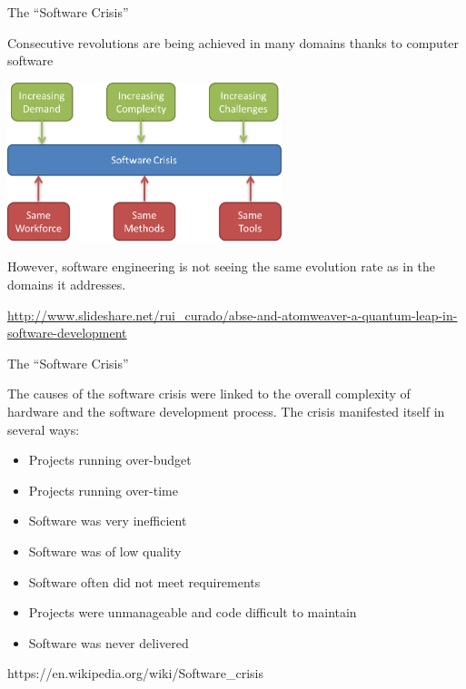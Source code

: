 \documentclass{beamer}
\begin{document}
\begin{frame}{\centerline{The ``Software Crisis''}}

Consecutive revolutions are being achieved in many domains thanks to computer software

\begin{center}
\includegraphics[width=80mm]{A2022.IDSEPC.ProcessoDiProduzione/pic-02.png}
\end{center}
However, software engineering is not seeing the same evolution rate as in the domains it addresses.

\begin{center}
\tiny
\url{http://www.slideshare.net/rui\_curado/abse-and-atomweaver-a-quantum-leap-in-software-development}
\end{center}



\end{frame}
\begin{frame}{\centerline{The ``Software Crisis''}}

The causes of the software crisis were linked to the overall complexity of hardware and the software development process. The crisis manifested itself in several ways:
\begin{itemize}
\item Projects running over-budget
\item Projects running over-time
\item Software was very inefficient
\item Software was of low quality
\item Software often did not meet requirements
\item Projects were unmanageable and code difficult to maintain
\item Software was never delivered
\end{itemize}

\begin{small}
https://en.wikipedia.org/wiki/Software\_crisis
\end{small}
\end{frame}
\end{document}
